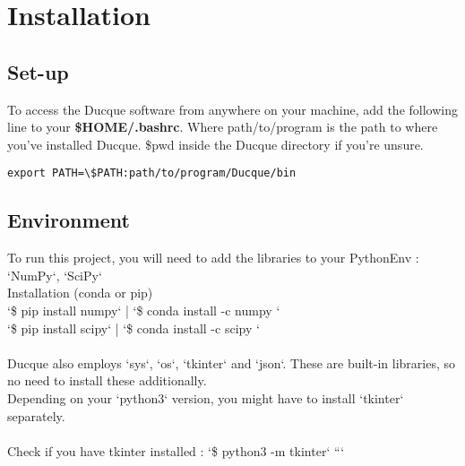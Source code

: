 
\pagebreak
\section{Installation}
\subsection{Set-up}
To access the Ducque software from anywhere on your machine, add the following line to your \textbf{\$HOME/.bashrc}.
Where path/to/program is the path to where you've installed Ducque. \$pwd inside the Ducque directory if you're unsure.
\begin{verbatim}
export PATH=\$PATH:path/to/program/Ducque/bin
\end{verbatim}

\subsection{Environment}
To run this project, you will need to add the libraries to your PythonEnv : `NumPy`, `SciPy`\\
Installation (conda or pip)\\
`\$ pip install numpy` | `\$ conda install -c numpy `\\

`\$ pip install scipy` | `\$ conda install -c scipy `\\
\\
Ducque also employs `sys`, `os`, `tkinter` and `json`. These are built-in libraries, so no need to install these additionally.\\
Depending on your `python3` version, you might have to install `tkinter` separately.\\
\\
Check if you have tkinter installed : `\$ python3 -m tkinter`
```
